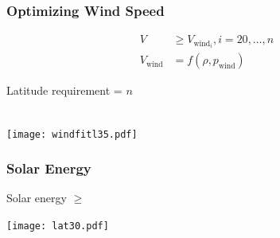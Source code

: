 \documentclass{beamer}
\begin{document}
\begin{frame}
    \frametitle{Optimizing Wind Speed}

    \begin{align*}
        V &\geq V_{\text{wind}_i}, i = 20,\dots,n \\
        V_{\text{wind}} &= f(\rho, p_{\text{wind}})
    \end{align*}

    Latitude requirement = $n$ \\~\\

    \begin{center}
    \texttt{[image: windfitl35.pdf]}
    \end{center}

\end{frame}

\begin{frame}
    \frametitle{Solar Energy}

    Solar energy $\geq$ 

    \begin{center}
    \texttt{[image: lat30.pdf]}
    \end{center}
\end{frame}
\end{document}
